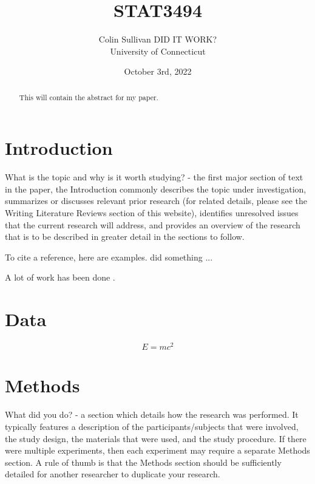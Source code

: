 \documentclass[12pt]{article}
\title{STAT3494}
\author{Colin Sullivan DID IT WORK?\\
University of Connecticut}
\date{October 3rd, 2022}
\begin{document}
\maketitle

\begin{abstract}

This will contain the abstract for my paper.


\end{abstract}

\section{Introduction}

What is the topic and why is it worth studying? - the first major section of text in the paper, the Introduction commonly describes the topic under investigation, summarizes or discusses relevant prior research (for related details, please see the Writing Literature Reviews section of this website), identifies unresolved issues that the current research will address, and provides an overview of the research that is to be described in greater detail in the sections to follow.



To cite a reference, here are examples.
\citet{xie2015dynamic} did something ... 

A lot of work has been done \citep[e.g.,][]{xie2015dynamic}.


\section{Data}

\begin{equation}
  \label{eq:mc2}
  E= m c^2
\end{equation}



\section{Methods}

What did you do? - a section which details how the research was performed.  It typically features a description of the participants/subjects that were involved, the study design, the materials that were used, and the study procedure.  If there were multiple experiments, then each experiment may require a separate Methods section.  A rule of thumb is that the Methods section should be sufficiently detailed for another researcher to duplicate your research.
\end{document}
